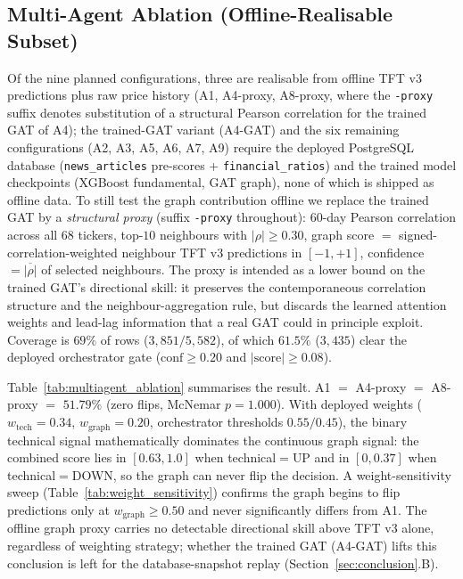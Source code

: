 \documentclass[conference]{IEEEtran}
\begin{document}
\subsection{Multi-Agent Ablation (Offline-Realisable Subset)}\label{sec:multiagent_ablation}

Of the nine planned configurations, three are realisable from offline TFT v3 predictions plus raw price history (A1, A4-proxy, A8-proxy, where the \texttt{-proxy} suffix denotes substitution of a structural Pearson correlation for the trained GAT of A4); the trained-GAT variant (A4-GAT) and the six remaining configurations (A2, A3, A5, A6, A7, A9) require the deployed PostgreSQL database (\texttt{news\_articles} pre-scores + \texttt{financial\_ratios}) and the trained model checkpoints (XGBoost fundamental, GAT graph), none of which is shipped as offline data. To still test the graph contribution offline we replace the trained GAT by a \emph{structural proxy} (suffix \texttt{-proxy} throughout): $60$-day Pearson correlation across all $68$ tickers, top-$10$ neighbours with $|\rho| \geq 0.30$, graph score $=$ signed-correlation-weighted neighbour TFT v3 predictions in $[-1, +1]$, confidence $= \overline{|\rho|}$ of selected neighbours. The proxy is intended as a lower bound on the trained GAT's directional skill: it preserves the contemporaneous correlation structure and the neighbour-aggregation rule, but discards the learned attention weights and lead-lag information that a real GAT could in principle exploit. Coverage is $69\%$ of rows ($3{,}851/5{,}582$), of which $61.5\%$ ($3{,}435$) clear the deployed orchestrator gate ($\text{conf}\!\ge\!0.20$ and $|\text{score}|\!\ge\!0.08$).

Table~\ref{tab:multiagent_ablation} summarises the result. A1 $=$ A4-proxy $=$ A8-proxy $=$ $51.79\%$ (zero flips, McNemar $p = 1.000$). With deployed weights ($w_\text{tech}\!=\!0.34$, $w_\text{graph}\!=\!0.20$, orchestrator thresholds $0.55/0.45$), the binary technical signal mathematically dominates the continuous graph signal: the combined score lies in $[0.63, 1.0]$ when technical$=$UP and in $[0, 0.37]$ when technical$=$DOWN, so the graph can never flip the decision. A weight-sensitivity sweep (Table~\ref{tab:weight_sensitivity}) confirms the graph begins to flip predictions only at $w_\text{graph} \geq 0.50$ and never significantly differs from A1. The offline graph proxy carries no detectable directional skill above TFT v3 alone, regardless of weighting strategy; whether the trained GAT (A4-GAT) lifts this conclusion is left for the database-snapshot replay (Section~\ref{sec:conclusion}.B).
\end{document}
